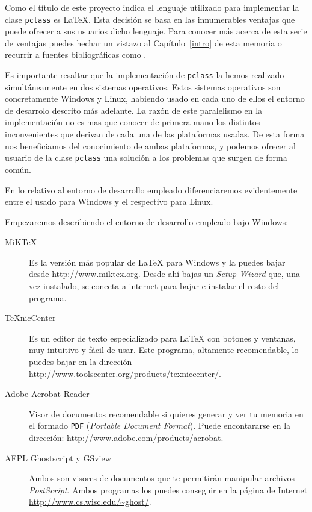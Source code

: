 Como el t\'itulo de este proyecto indica el lenguaje utilizado para implementar la clase \texttt{pclass} es \LaTeX{}. 
Esta decisi\'on se basa en las innumerables ventajas que puede ofrecer a sus usuarios dicho lenguaje. Para conocer m\'as 
acerca de esta serie de ventajas puedes hechar un vistazo al Cap\'itulo~\ref{intro} de esta memoria o recurrir a fuentes 
bibliogr\'aficas como \cite{primpasos}.

Es importante resaltar que la implementaci\'on de \texttt{pclass} la hemos realizado simult\'aneamente en dos sistemas 
operativos. Estos sistemas operativos son concretamente Windows y Linux, habiendo usado en cada uno de ellos el entorno
de desarrolo descrito m\'as adelante. La raz\'on de este paralelismo en la implementaci\'on no es mas que conocer de 
primera mano los distintos inconvenientes que derivan de cada una de las plataformas usadas. De esta forma nos 
beneficiamos del conocimiento de ambas plataformas, y podemos ofrecer al usuario de la clase \texttt{pclass} una 
soluci\'on a los problemas que surgen de forma com\'un.

En lo relativo al entorno de desarrollo empleado diferenciaremos evidentemente entre el usado para Windows y el 
respectivo para Linux.


Empezaremos describiendo el entorno de desarrollo empleado bajo Windows:

\begin{description}
		\item[MiK\TeX{}] Es la versi\'on m\'as popular de \LaTeX{} para Windows y la puedes bajar desde 
										\url{http://www.miktex.org}. Desde ah\'i bajas un \emph{Setup Wizard} que, una vez instalado, 
										se conecta a internet para bajar e instalar el resto del programa.
		
		\item[\TeX{}nicCenter] Es un editor de texto especializado para \LaTeX{} con botones y ventanas,
													muy intuitivo y f\'acil de usar. Este programa, altamente recomendable, lo puedes
													bajar en la direcci\'on \url{http://www.toolscenter.org/products/texniccenter/}.
		
		\item[Adobe Acrobat Reader] Visor de documentos recomendable si quieres generar y ver tu memoria en el formado 
															\texttt{PDF} (\emph{Portable Document Format}). Puede encontararse en la direcci\'on: 
															\url{http://www.adobe.com/products/acrobat}.
		
		\item[AFPL Ghostscript y GSview] Ambos son visores de documentos que te permitir\'an manipular archivos 
																		\emph{PostScript}. Ambos programas los puedes conseguir en la p\'agina de 
																		Internet \url{http://www.cs.wisc.edu/~ghost/}.
		
\end{description}


